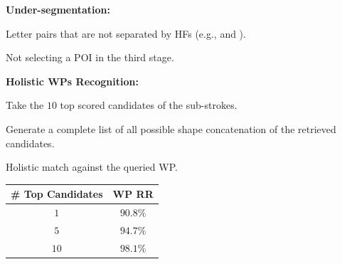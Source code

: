 \documentclass[a0paper,portrait]{baposter}
\begin{document}
\begin{poster}
{\textbf{Under-segmentation:}
\begin{compactitem}
\item Letter pairs that are not separated by HFs (e.g.,  and  ).
\item Not selecting a POI in the third stage.\\
\end{compactitem}

\textbf{Holistic WPs Recognition:}
\begin{compactenum}
\item Take the $10$ top scored candidates of the sub-strokes.
\item Generate a complete list of all possible shape concatenation of the retrieved candidates. 
\item Holistic match against the queried WP.  
\end{compactenum}
\vspace{-15pt}
\begin{center}
\begin{tabular}{c c}
\toprule
\textbf{\# Top Candidates } & \textbf{WP RR}\\
\midrule
\rowcolor{IceBlue}
$1$ & $90.8\%$ \\
\rowcolor{IceBlue2}
$5$ & $94.7\%$ \\
\rowcolor{IceBlue}
$10$ & $98.1\%$ \\
\bottomrule
\end{tabular}
\end{center}


}


\end{poster}
\end{document}
